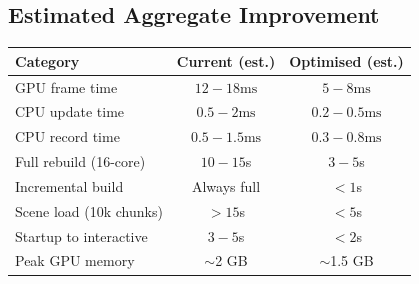 \documentclass[11pt,a4paper]{article}
\newcommand{\ms}{\ensuremath{\text{ms}}}
\begin{document}
\subsection{Estimated Aggregate Improvement}

\begin{center}
\begin{tabular}{lcc}
\toprule
\textbf{Category} & \textbf{Current (est.)} & \textbf{Optimised (est.)} \\
\midrule
GPU frame time & $12{-}18\ms$ & $5{-}8\ms$ \\
CPU update time & $0.5{-}2\ms$ & $0.2{-}0.5\ms$ \\
CPU record time & $0.5{-}1.5\ms$ & $0.3{-}0.8\ms$ \\
Full rebuild (16-core) & $10{-}15$s & $3{-}5$s \\
Incremental build & Always full & $<1$s \\
Scene load (10k chunks) & $>15$s & $<5$s \\
Startup to interactive & $3{-}5$s & $<2$s \\
Peak GPU memory & $\sim$2 GB & $\sim$1.5 GB \\
\bottomrule
\end{tabular}
\end{center}
\end{document}
